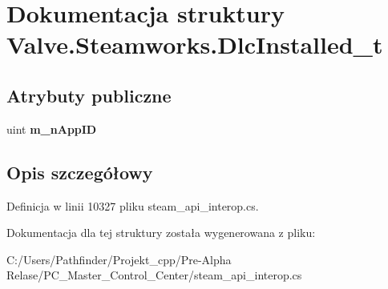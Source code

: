 \hypertarget{struct_valve_1_1_steamworks_1_1_dlc_installed__t}{}\section{Dokumentacja struktury Valve.\+Steamworks.\+Dlc\+Installed\+\_\+t}
\label{struct_valve_1_1_steamworks_1_1_dlc_installed__t}
\subsection*{Atrybuty publiczne}
\begin{DoxyCompactItemize}
\item 
\mbox{\label{struct_valve_1_1_steamworks_1_1_dlc_installed__t_ab66184edbd94d60e8af2ef76574185ef}} 
uint {\bfseries m\+\_\+n\+App\+ID}
\end{DoxyCompactItemize}


\subsection{Opis szczegółowy}


Definicja w linii 10327 pliku steam\+\_\+api\+\_\+interop.\+cs.



Dokumentacja dla tej struktury została wygenerowana z pliku\+:\begin{DoxyCompactItemize}
\item 
C\+:/\+Users/\+Pathfinder/\+Projekt\+\_\+cpp/\+Pre-\/\+Alpha Relase/\+P\+C\+\_\+\+Master\+\_\+\+Control\+\_\+\+Center/steam\+\_\+api\+\_\+interop.\+cs\end{DoxyCompactItemize}
